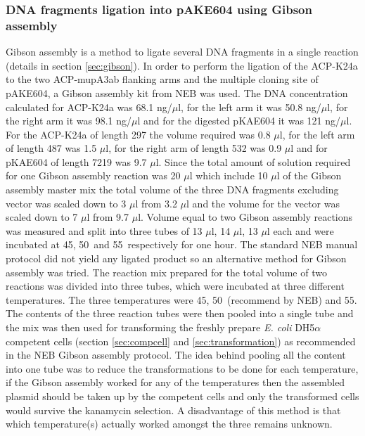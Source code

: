 	\subsubsection{DNA fragments ligation into pAKE604 using Gibson assembly}
	\label{sec:chap4gibson}
	Gibson assembly is a method to ligate several DNA fragments in a single reaction (details in section \ref{sec:gibson}). In order to perform the ligation of the ACP-K24a to the two ACP-mupA3ab flanking arms and the multiple cloning site of pAKE604, a Gibson assembly kit from NEB was used. %
	The DNA concentration calculated for ACP-K24a was 68.1 ng/$ \mu $l, for the left arm it was 50.8 ng/$ \mu $l, for the right arm it was 98.1 ng/$ \mu $l and for the digested pKAE604 it was 121 ng/$ \mu $l. For the ACP-K24a of length 297 the volume required was 0.8 $ \mu $l, for the left arm of length 487 was 1.5 $ \mu $l, for the right arm of length 532 was 0.9 $ \mu $l and for pKAE604 of length 7219 was 9.7 $ \mu $l. Since the total amount of solution required for one Gibson assembly reaction was 20 $ \mu $l which include 10  $\mu $l of the Gibson assembly master mix the total volume of the three DNA fragments excluding vector was scaled down to 3 $ \mu $l from 3.2 $ \mu $l and the volume for the vector was scaled down to 7 $ \mu $l from 9.7 $ \mu $l. Volume equal to two Gibson assembly reactions was measured and split into three tubes of 13 $ \mu $l, 14 $ \mu $l, 13 $ \mu $l each and were incubated at 45\textcelsius,  50\textcelsius \ and 55\textcelsius \ respectively for one hour. The standard NEB manual protocol did not yield any ligated product so an alternative method for Gibson assembly was tried. The reaction mix prepared for the total volume of two reactions was divided into three tubes, which were incubated at three different temperatures. The three temperatures were 45\textcelsius,  50\textcelsius \ (recommend by NEB) and 55\textcelsius. The contents of the three reaction tubes were then pooled into a single tube  and the mix was then used for transforming the freshly prepare \textit{E. coli} DH5$ \alpha $ competent cells (section \ref{sec:compcell} and \ref{sec:transformation}) as recommended in the NEB Gibson assembly protocol. The idea behind pooling all the content into one tube was to reduce the transformations to be done for each temperature, if the Gibson assembly worked for any of the temperatures then the assembled plasmid should be taken up by the competent cells and only the transformed cells would survive the kanamycin selection. A disadvantage of this method is that which temperature(s) actually worked amongst the three remains unknown.
	
